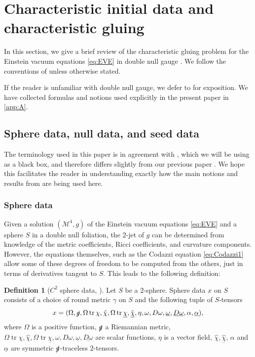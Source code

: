 \documentclass[10pt]{article}
\numberwithin{equation}{section}
\theoremstyle{plain}
\theoremstyle{definition}
\newtheorem{defn}{Definition}[section]
\newcommand{\tr}{\operatorname{tr}}
\begin{document}
\section{Characteristic initial data and characteristic gluing}  

In this section, we give a brief review of the characteristic gluing problem for the Einstein vacuum equations \eqref{eq:EVE} in double null gauge \cite{ACR1, ACR2, ACR3, Czimek2022-cl}.  We follow the conventions of \cite{Czimek2022-cl} unless otherwise stated.

If the reader is unfamiliar with double null gauge, we defer to \cite{Christo09} for exposition. We have collected formulas and notions used explicitly in the present paper in \cref{app:A}.


\subsection{Sphere data, null data, and seed data}

The terminology used in this paper is in agreement with \cite{Czimek2022-cl}, which we will be using as a black box, and therefore differs slightly from our previous paper \cite{KU22}. We hope this facilitates the reader in understanding exactly how the main notions and results from \cite{Czimek2022-cl} are being used here. 

\subsubsection{Sphere data} \label{sec:sphere-data}

Given a solution $(\mathcal M^4,g)$ of the Einstein vacuum equations \eqref{eq:EVE} and a sphere $S$ in a double null foliation, the 2-jet of $g$ can be determined from knowledge of the metric coefficients, Ricci coefficients, and curvature components. However, the equations themselves, such as the Codazzi equation \eqref{eq:Codazzi1} allow some of these degrees of freedom to be computed from the others, just in terms of derivatives tangent to $S$. This leads to the following definition:


\begin{defn}[$C^2$ sphere data, {\cite[Definition 2.4]{ACR2}}]\label{def:C2-data}
Let $S$ be a $2$-sphere. Sphere data $x$ on $S$ consists of a choice of round metric $\gamma$ on $S$ and the following tuple of $S$-tensors
\begin{equation}
    x= (\Omega, \slashed g, \Omega \tr\chi , \hat \chi, \Omega \tr \underline\chi, \hat{\underline \chi}, \eta, \omega, D \omega,\underline \omega, \underline{D \omega} , \alpha, \underline \alpha), \label{eq:sphere-defn}
\end{equation}
where $\Omega$ is a positive function, $\slashed g$ a Riemannian metric, $\Omega \tr\chi , \hat \chi, \Omega \tr \underline\chi, \omega, D \omega,\underline \omega, \underline{D \omega} $ are scalar functions, $\eta$ is a vector field, $\hat \chi, \hat{\underline \chi}$, $\alpha$ and $\underline \alpha$ are symmetric $\slashed g$-traceless $2$-tensors. 
\end{defn}
\end{document}

